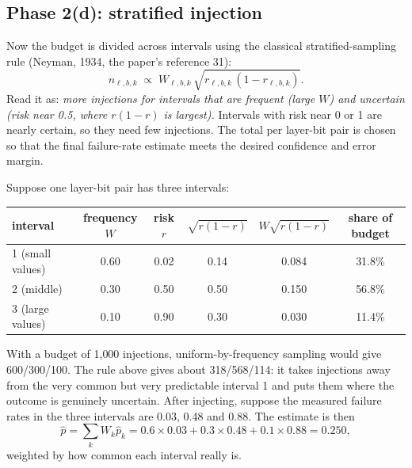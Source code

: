 \subsection{Phase 2(d): stratified injection}
Now the budget is divided across intervals using the classical stratified-sampling rule (Neyman, 1934, the paper's reference 31):
\begin{equation}\label{eq:alloc}
n_{\ell,b,k}\;\propto\;W_{\ell,b,k}\,\sqrt{r_{\ell,b,k}\,(1-r_{\ell,b,k})}.
\end{equation}
Read it as: \emph{more injections for intervals that are frequent (large $W$) and uncertain (risk near 0.5, where $r(1-r)$ is largest).} Intervals with risk near 0 or 1 are nearly certain, so they need few injections. The total per layer-bit pair is chosen
so that the final failure-rate estimate meets the desired confidence and error margin.

\begin{worked}
Suppose one layer-bit pair has three intervals:
\begin{center}\small
\begin{tabular}{lccccc}
\toprule
interval & frequency $W$ & risk $r$ & $\sqrt{r(1-r)}$ & $W\sqrt{r(1-r)}$ & share of budget \\
\midrule
1 (small values) & 0.60 & 0.02 & 0.14 & 0.084 & 31.8\% \\
2 (middle) & 0.30 & 0.50 & 0.50 & 0.150 & 56.8\% \\
3 (large values) & 0.10 & 0.90 & 0.30 & 0.030 & 11.4\% \\
\bottomrule
\end{tabular}
\end{center}
With a budget of 1{,}000 injections, uniform-by-frequency sampling would give 600/300/100. The rule above gives about 318/568/114: it takes injections away from the very common but very predictable interval 1 and
puts them where the outcome is genuinely uncertain. After injecting, suppose the measured failure rates in the three intervals are 0.03, 0.48 and 0.88. The estimate is then
\[
\hat p=\sum_k W_k\hat p_k=0.6\times0.03+0.3\times0.48+0.1\times0.88=0.250,
\]
weighted by how common each interval really is.
\end{worked}

